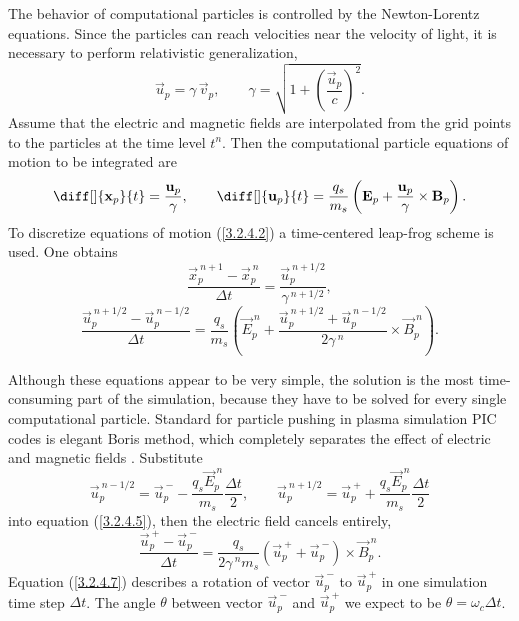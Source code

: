 The behavior of computational particles is controlled by the Newton-Lorentz equations. Since the particles can reach velocities near the velocity of light, it is necessary to perform relativistic generalization,
\begin{equation}
\label{3.2.4.1}
\vec{u}_{p} = \gamma \, \vec{v}_{p}, \qquad \gamma = \sqrt{1 + \left( \frac{\vec{u}_{p}}{c}\right)^{2}}.
\end{equation}
Assume that the electric and magnetic fields are interpolated from the grid points to the particles at the time level $ t^{n} $. Then the computational particle equations of motion to be integrated are
\begin{equation}
\label{3.2.4.2}
\diff[]{\vec{x}_{p}}{t} = \frac{\vec{u}_{p}}{\gamma}, \qquad \diff[]{\vec{u}_{p}}{t} = \frac{q_{s}}{m_{s}} \left(\vec{E}_{p} + \frac{\vec{u}_{p}}{\gamma} \times \vec{B}_{p} \right).
\end{equation}
To discretize equations of motion (\ref{3.2.4.2}) a time-centered leap-frog scheme is used. One obtains
\begin{equation}
\label{3.2.4.4}
\frac{\vec{x}_{p}^{\:n+1} - \vec{x}_{p}^{\:n}}{\Delta t} = \frac{\vec{u}_{p}^{\:n + 1/2}}{\gamma^{\:n+1/2}},
\end{equation}
\begin{equation}
\label{3.2.4.5}
\frac{\vec{u}_{p}^{\:n+1/2} - \vec{u}_{p}^{\:n-1/2}}{\Delta t} = \frac{q_{s}}{m_{s}} \left( \vec{E}_{p}^{\:n} + \frac{\vec{u}_{p}^{\:n+1/2} + \vec{u}_{p}^{\:n-1/2}}{2 \gamma^{\:n}} \times \vec{B}_{p}^{\:n} \right).
\end{equation}

Although these equations appear to be very simple, the solution is the most time-consuming part of the simulation, because they have to be solved for every single computational particle. Standard for particle pushing in plasma simulation PIC codes is elegant Boris method, which completely separates the effect of electric and magnetic fields \cite{birdsall}. Substitute
\begin{equation}
\label{3.2.4.6}
\vec{u}_{p}^{\:n-1/2} = \vec{u}_{p}^{\:-} - \frac{q_{s} \vec{E}_{p}^{\:n}}{m_{s}} \frac{\Delta t}{2}, \qquad \vec{u}_{p}^{\:n+1/2} = \vec{u}_{p}^{\:+} + \frac{q_{s} \vec{E}_{p}^{\:n}}{m_{s}} \frac{\Delta t}{2}
\end{equation}
into equation (\ref{3.2.4.5}), then the electric field cancels entirely,
\begin{equation}
\label{3.2.4.7}
\frac{\vec{u}_{p}^{\:+} - \vec{u}_{p}^{\:-}}{\Delta t} = \frac{q_{s}}{2 \gamma^{\:n} m_{s}} \left(\vec{u}_{p}^{\:+} + \vec{u}_{p}^{\:-}\right)\times \vec{B}_{p}^{\:n}. 
\end{equation}
Equation (\ref{3.2.4.7}) describes a rotation of vector $ \vec{u}_{p}^{\:-} $ to $ \vec{u}_{p}^{\:+} $ in one simulation time step $ \Delta t $. The angle $ \theta $ between vector $ \vec{u}_{p}^{\:-} $ and $ \vec{u}_{p}^{\:+} $ we expect to be $ \theta = \omega_{c} \Delta t $.

